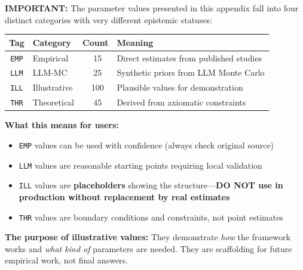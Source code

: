 \documentclass[11pt,a4paper]{article}
\theoremstyle{definition}
\begin{document}
\begin{tcolorbox}[colback=red!10!white, colframe=red!75!black, 
    title=\textbf{⚠ CRITICAL DISCLAIMER: Epistemic Status of Parameter Values}]

\textbf{IMPORTANT:} The parameter values presented in this appendix fall into 
four distinct categories with very different epistemic statuses:

\begin{center}
\renewcommand{\arraystretch}{1.4}
\begin{tabular}{@{}clcp{6cm}@{}}
\toprule
\textbf{Tag} & \textbf{Category} & \textbf{Count} & \textbf{Meaning} \\
\midrule
\cellcolor{green!20}\texttt{EMP} & Empirical & ~15 & Direct estimates from published studies \\
\cellcolor{blue!20}\texttt{LLM} & LLM-MC & ~25 & Synthetic priors from LLM Monte Carlo \\
\cellcolor{yellow!20}\texttt{ILL} & Illustrative & ~100 & Plausible values for demonstration \\
\cellcolor{gray!20}\texttt{THR} & Theoretical & ~45 & Derived from axiomatic constraints \\
\bottomrule
\end{tabular}
\end{center}

\tcblower

\textbf{What this means for users:}

\begin{itemize}[nosep]
\item \texttt{EMP} values can be used with confidence (always check original source)
\item \texttt{LLM} values are reasonable starting points requiring local validation
\item \texttt{ILL} values are \textbf{placeholders} showing the structure---\textbf{DO NOT use in production without replacement by real estimates}
\item \texttt{THR} values are boundary conditions and constraints, not point estimates
\end{itemize}

\textbf{The purpose of illustrative values:} They demonstrate \textit{how} the 
framework works and \textit{what kind of} parameters are needed. They are 
scaffolding for future empirical work, not final answers.

\end{tcolorbox}
\end{document}
